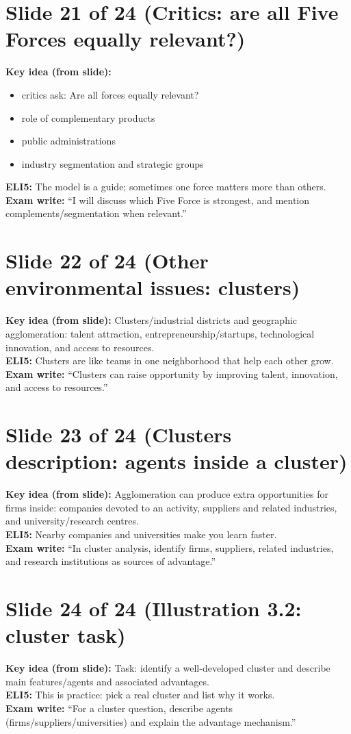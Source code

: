 \documentclass[11pt,a4paper]{article}
\begin{document}
\section*{Slide 21 of 24 (Critics: are all Five Forces equally relevant?)}
\textbf{Key idea (from slide):}
\begin{itemize}
  \item critics ask: Are all forces equally relevant?
  \item role of complementary products
  \item public administrations
  \item industry segmentation and strategic groups
\end{itemize}
\textbf{ELI5:} The model is a guide; sometimes one force matters more than others.\\
\textbf{Exam write:} ``I will discuss which Five Force is strongest, and mention complements/segmentation when relevant.''

\section*{Slide 22 of 24 (Other environmental issues: clusters)}
\textbf{Key idea (from slide):} Clusters/industrial districts and geographic agglomeration: talent attraction, entrepreneurship/startups, technological innovation, and access to resources.\\
\textbf{ELI5:} Clusters are like teams in one neighborhood that help each other grow.\\
\textbf{Exam write:} ``Clusters can raise opportunity by improving talent, innovation, and access to resources.''

\section*{Slide 23 of 24 (Clusters description: agents inside a cluster)}
\textbf{Key idea (from slide):} Agglomeration can produce extra opportunities for firms inside: companies devoted to an activity, suppliers and related industries, and university/research centres.\\
\textbf{ELI5:} Nearby companies and universities make you learn faster.\\
\textbf{Exam write:} ``In cluster analysis, identify firms, suppliers, related industries, and research institutions as sources of advantage.''

\section*{Slide 24 of 24 (Illustration 3.2: cluster task)}
\textbf{Key idea (from slide):} Task: identify a well-developed cluster and describe main features/agents and associated advantages.\\
\textbf{ELI5:} This is practice: pick a real cluster and list why it works.\\
\textbf{Exam write:} ``For a cluster question, describe agents (firms/suppliers/universities) and explain the advantage mechanism.''
\end{document}

